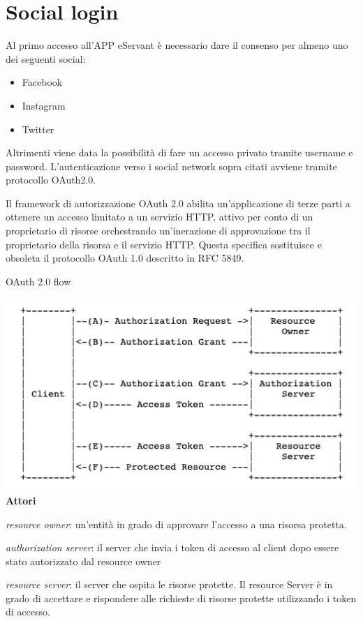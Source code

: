 \section{Social login}
Al primo accesso all'APP eServant è necessario dare il consenso per almeno uno dei seguenti social:
\begin{itemize}
\item Facebook
\item Instagram
\item Twitter
\end{itemize}

Altrimenti viene data la possibilità di fare un accesso privato tramite username e password.
L'autenticazione verso i social network sopra citati avviene tramite protocollo OAuth2.0.

Il framework di autorizzazione OAuth 2.0 abilita un'applicazione di terze parti a ottenere un accesso limitato a un servizio HTTP, attivo
per conto di un proprietario di risorse orchestrando un'inerazione di approvazione tra il proprietario della risorsa e il servizio HTTP.
Questa specifica sostituisce e obsoleta il protocollo OAuth 1.0 descritto in RFC 5849.

OAuth 2.0 flow 

\includegraphics[scale=0.60]{img/cap2/oauth20-1}\\

\textbf{Attori}

\textit{resource owner}: un'entità in grado di approvare l'accesso a una risorsa protetta.

\textit{authorization server}: il server che invia i token di accesso al client dopo essere stato autorizzato
dal resource owner

\textit{resource server}: il server che ospita le risorse protette. Il resource Server è in grado di accettare
e rispondere alle richieste di risorse protette utilizzando i token di accesso.

